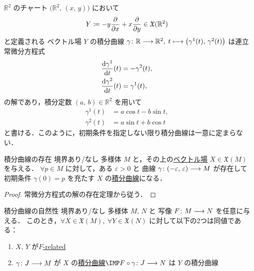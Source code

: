 \documentclass[TQFT_main]{subfiles}
\begin{document}
\begin{myexample}[label=ex:integral-curve1]{}
    $\mathbb{R}^2$ のチャート $\bigl(\mathbb{R}^2,\, (x,\, y)\bigr)$ において
    \begin{align}
        Y \coloneqq - y \pdv{}{x} + x \pdv{}{y} \in \mathfrak{X} (\mathbb{R}^2)
    \end{align}
    と定義される \cinfty ベクトル場 $Y$ の積分曲線 $\gamma \colon \mathbb{R} \longrightarrow \mathbb{R}^2,\; t \longmapsto \bigl( \gamma^1(t),\, \gamma^2 (t)\bigr) $ は連立常微分方程式
    \begin{align}
        \dv{\gamma^1}{t}()(t) &= - \gamma^2 (t), \\
        \dv{\gamma^2}{t}()(t) &= \gamma^1 (t),
    \end{align}
    の解であり，積分定数 $(a,\, b) \in \mathbb{R}^2$ を用いて
    \begin{align}
        \gamma^1(t) &= a \cos t - b \sin t, \\
        \gamma^2(t) &= a \sin t + b \cos t
    \end{align}
    と書ける．このように，初期条件を指定しない限り積分曲線は一意に定まらない．
\end{myexample}


\begin{myprop}[label=prop:existence-integral]{積分曲線の存在}
    境界あり/なし \cinfty 多様体 $M$ と，その上の\hyperref[def:vecf]{\cinfty ベクトル場} $X \in \mathfrak{X}(M)$ を与える．
    $\forall p \in M$ に対して，ある $\varepsilon > 0$ と \cinfty 曲線 $\gamma \colon (-\varepsilon,\, \varepsilon) \longrightarrow M$ が存在して
    初期条件 $\gamma(0) = p$ を充たす $X$ の\hyperref[def:integral-curve]{積分曲線}になる．
\end{myprop}

\begin{proof}
    常微分方程式の解の存在定理から従う．
\end{proof}

\begin{myprop}[label=prop:natural-integral-curve]{積分曲線の自然性}
    境界あり/なし \cinfty 多様体 $M,\, N$ と \cinfty 写像 $F \colon M \longrightarrow N$ を任意に与える．
    このとき，$\forall X \in \mathfrak{X}(M),\; \forall Y \in \mathfrak{X}(N)$ に対して以下の2つは同値である：
    \begin{enumerate}
        \item $X,\, Y$ が\hyperref[def:F-related]{$F$-related}
        \item $\gamma \colon J \longrightarrow M$ が $X$ の\hyperref[def:integral-curve]{積分曲線}$\IMP F \circ \gamma \colon J \lto N$ は $Y$ の積分曲線
    \end{enumerate}
\end{myprop}
\end{document}
